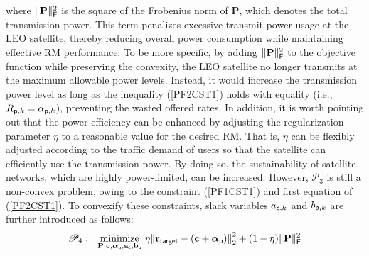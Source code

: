 \documentclass[draftclsnofoot, onecolumn, comsoc, 12pt]{IEEEtran}
\DeclareMathOperator*{\minimize}{minimize}
\begin{document}
where $\Vert \mathbf{P} \Vert_{\sf{F}}^{2}$ is the square of the Frobenius norm of $\mathbf{P}$, which denotes the total transmission power. 
{ This term penalizes excessive transmit power usage at the LEO satellite, thereby reducing overall power consumption while maintaining effective RM performance.
To be more specific, by adding $\Vert \mathbf{P} \Vert_{\sf{F}}^{2}$ to the objective function while preserving the convexity, the LEO satellite no longer transmits at the maximum allowable power levels. Instead, it would increase the transmission power level as long as the inequality (\ref{PF2CST1}) holds with equality (i.e., $R_{{\sf{p}},k} = \alpha_{{\sf{p}},k}$), preventing the wasted offered rates.}
In addition, it is worth pointing out that the power efficiency can be enhanced by adjusting the regularization parameter $\eta$ to a reasonable value for the desired RM.
That is, $\eta$ can be flexibly adjusted according to the traffic demand of users so that the satellite can efficiently use the transmission power.
By doing so, the sustainability of satellite networks, which are highly power-limited, can be increased.
However, $\mathscr{P}_3$ is still a non-convex problem, owing to the constraint (\ref{PF1CST1}) and first equation of (\ref{PF2CST1}). To convexify these constraints, slack variables $a_{{\sf{c}},k}$ and $b_{{\sf{p}},k}$ are further introduced as follows:
\begin{align}
\nonumber
\mathscr{P}_4: \,\,\,\, 
\minimize_{\mathbf{P}, \mathbf{c}, \boldsymbol{\alpha}_{\sf{p}}, \mathbf{a}_{\sf{c}}, \mathbf{b}_{\sf{p}}} \,
\eta{\Vert {\mathbf{r}_{\sf target}- (\mathbf{c} + \boldsymbol{\alpha}_{\sf{p}})} \Vert}_{2}^{2} + (1-\eta) \Vert {\mathbf{P}} \Vert_{\sf{F}}^{2}
\end{align}\setcounter{equation}{22}%
\end{document}
